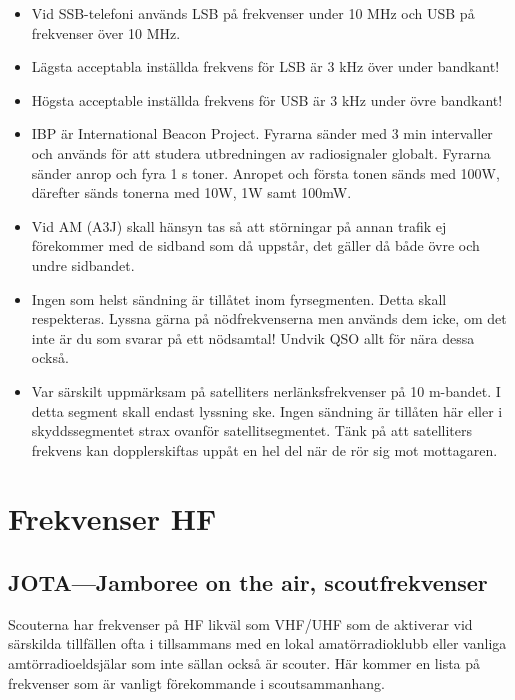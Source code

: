 \begin{itemize}
\item Vid SSB-telefoni används LSB på frekvenser under 10 MHz och USB på frekvenser över 10 MHz.
\item Lägsta acceptabla inställda frekvens för LSB är 3 kHz över under bandkant! 
\item Högsta acceptable inställda frekvens för USB är 3 kHz under övre bandkant!
\item IBP är International Beacon Project. Fyrarna sänder med 3 min intervaller och används för att studera utbredningen av radiosignaler globalt. Fyrarna sänder anrop och fyra 1 s toner. Anropet och första tonen sänds med 100W, därefter sänds tonerna med 10W, 1W samt 100mW.
\item Vid AM (A3J) skall hänsyn tas så att störningar på annan trafik ej fö\-re\-kom\-mer med de sidband som då uppstår, det gäller då både övre och undre sidbandet.
\item Ingen som helst sändning är tillåtet inom fyrsegmenten. Detta skall respekteras. Lyssna gärna på nödfrekvenserna men används dem icke, om det inte är du som svarar på ett nödsamtal! Undvik QSO allt för nära dessa också.
\item Var särskilt uppmärksam på satelliters nerlänksfrekvenser på 10 m-bandet. I detta segment skall endast lyssning ske. Ingen sändning är tillåten här eller i skyddssegmentet strax ovanför satellitsegmentet. Tänk på att satelliters frekvens kan dopplerskiftas uppåt en hel del när de rör sig mot mottagaren.
\end{itemize}

\section{Frekvenser HF}

\subsection{JOTA---Jamboree on the air, scoutfrekvenser}

Scouterna har frekvenser på HF likväl som VHF/UHF som de aktiverar vid särskilda tillfällen ofta i tillsammans med en lokal amatörradioklubb eller vanliga amtörradioeldsjälar som inte sällan också är scouter. Här kommer en lista på frekvenser som är vanligt förekommande i scoutsammanhang.

